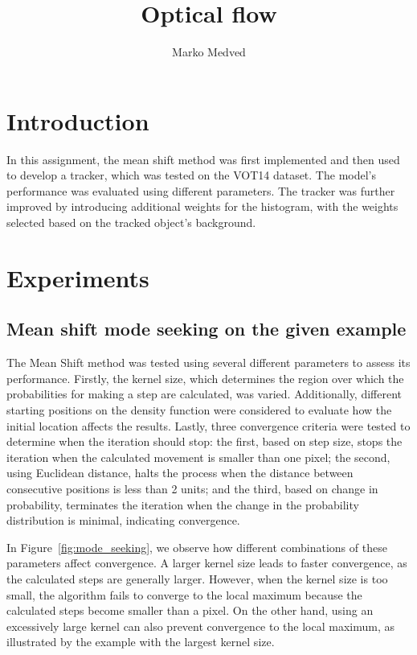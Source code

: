 \documentclass[9pt]{IEEEtran}
\title{\vspace{0ex}
Optical flow}
\author{Marko Medved\vspace{-4.0ex}}
\begin{document}
\maketitle

\section{Introduction}
In this assignment, the mean shift method was first implemented and then
 used to develop a tracker, which was tested on the VOT14 dataset. The model's
  performance was evaluated using different parameters. The tracker was 
  further improved by introducing additional weights for the histogram, 
  with the weights selected based on the tracked object's background.
\section{Experiments}
\subsection{Mean shift mode seeking on the given example}
The Mean Shift method was tested using several different parameters to assess 
its performance. Firstly, the kernel size, which determines the region over which
 the probabilities for making a step are calculated, was varied. Additionally, 
 different starting positions on the density function were considered to evaluate 
 how the initial location affects the results. Lastly, three convergence criteria
  were tested to determine when the iteration should stop: the first, based on step
  size, stops the iteration when the calculated movement is smaller than one pixel; 
  the second, using Euclidean distance, halts the process when the distance between 
  consecutive positions is less than 2 units; and the third, based on change in
   probability, terminates the iteration when the change in the probability 
   distribution is minimal, indicating convergence.

  In Figure~\ref{fig:mode_seeking}, we observe how different combinations of
   these parameters affect convergence. A larger kernel size leads to faster
    convergence, as the calculated steps are generally larger. However, when the 
    kernel size is too small, the algorithm fails to converge to the local maximum 
    because the calculated steps become smaller than a pixel. On the other hand, 
    using an excessively large kernel can also prevent convergence to the local
     maximum, as illustrated by the example with the largest kernel size.
\end{document}
